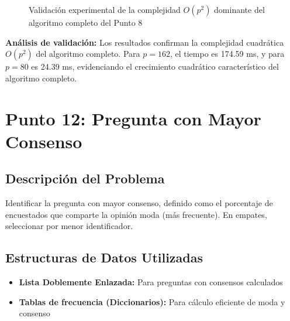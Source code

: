 \documentclass[11pt,a4paper]{article}
\begin{document}
\begin{figure}[H]
\centering
{}
\caption{Validación experimental de la complejidad $O(p^2)$ dominante del algoritmo completo del Punto 8}
\end{figure}

\textbf{Análisis de validación:} Los resultados confirman la complejidad cuadrática $O(p^2)$ del algoritmo completo. Para $p = 162$, el tiempo es 174.59 ms, y para $p = 80$ es 24.39 ms, evidenciando el crecimiento cuadrático característico del algoritmo completo.

\section{Punto 12: Pregunta con Mayor Consenso}

\subsection{Descripción del Problema}
Identificar la pregunta con mayor consenso, definido como el porcentaje de encuestados que comparte la opinión moda (más frecuente). En empates, seleccionar por menor identificador.

\subsection{Estructuras de Datos Utilizadas}
\begin{itemize}[label=\textbullet]
\item \textbf{Lista Doblemente Enlazada:} Para preguntas con consensos calculados
\item \textbf{Tablas de frecuencia (Diccionarios):} Para cálculo eficiente de moda y consenso
\end{itemize}
\end{document}
